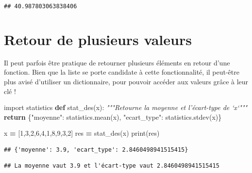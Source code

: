 \documentclass[12pt,]{book}
\newenvironment{Shaded}{\begin{snugshade}}{\end{snugshade}}
\newcommand{\KeywordTok}[1]{\textcolor[rgb]{0.13,0.29,0.53}{\textbf{#1}}}
\newcommand{\DecValTok}[1]{\textcolor[rgb]{0.00,0.00,0.81}{#1}}
\newcommand{\SpecialCharTok}[1]{\textcolor[rgb]{0.00,0.00,0.00}{#1}}
\newcommand{\StringTok}[1]{\textcolor[rgb]{0.31,0.60,0.02}{#1}}
\newcommand{\ImportTok}[1]{#1}
\newcommand{\CommentTok}[1]{\textcolor[rgb]{0.56,0.35,0.01}{\textit{#1}}}
\newcommand{\ControlFlowTok}[1]{\textcolor[rgb]{0.13,0.29,0.53}{\textbf{#1}}}
\newcommand{\OperatorTok}[1]{\textcolor[rgb]{0.81,0.36,0.00}{\textbf{#1}}}
\newcommand{\BuiltInTok}[1]{#1}
\newcommand{\NormalTok}[1]{#1}
\numberwithin{equation}{section}
\numberwithin{countremarque}{section}
\begin{document}
\begin{lstlisting}
## 40.987803063838406
\end{lstlisting}

\section{Retour de plusieurs valeurs}\label{retour-de-plusieurs-valeurs}

Il peut parfois être pratique de retourner plusieurs éléments en retour
d'une fonction. Bien que la liste se porte candidate à cette
fonctionnalité, il peut-être plus avisé d'utiliser un dictionnaire, pour
pouvoir accéder aux valeurs grâce à leur clé !

\begin{Shaded}
\begin{Highlighting}[]
\ImportTok{import}\NormalTok{ statistics}
\KeywordTok{def}\NormalTok{ stat_des(x):}
  \CommentTok{"""Retourne la moyenne et l'écart-type de `x`"""}
  \ControlFlowTok{return}\NormalTok{ \{}\StringTok{"moyenne"}\NormalTok{: statistics.mean(x),}
  \StringTok{"ecart_type"}\NormalTok{: statistics.stdev(x)\}}

\NormalTok{x }\OperatorTok{=}\NormalTok{ [}\DecValTok{1}\NormalTok{,}\DecValTok{3}\NormalTok{,}\DecValTok{2}\NormalTok{,}\DecValTok{6}\NormalTok{,}\DecValTok{4}\NormalTok{,}\DecValTok{1}\NormalTok{,}\DecValTok{8}\NormalTok{,}\DecValTok{9}\NormalTok{,}\DecValTok{3}\NormalTok{,}\DecValTok{2}\NormalTok{]}
\NormalTok{res }\OperatorTok{=}\NormalTok{ stat_des(x)}
\BuiltInTok{print}\NormalTok{(res)}
\end{Highlighting}
\end{Shaded}

\begin{lstlisting}
## {'moyenne': 3.9, 'ecart_type': 2.8460498941515415}
\end{lstlisting}

\begin{Shaded}
\end{Shaded}

\begin{lstlisting}
## La moyenne vaut 3.9 et l'écart-type vaut 2.8460498941515415
\end{lstlisting}
\end{document}
